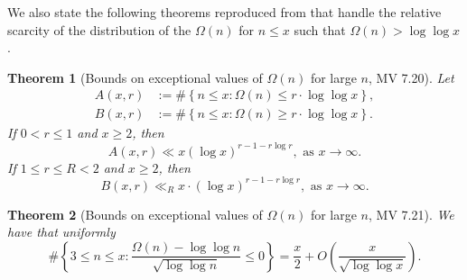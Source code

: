\documentclass[11pt,reqno,a4letter]{article}
\numberwithin{figure}{section}
\numberwithin{table}{section}
\theoremstyle{plain}
\newtheorem{theorem}{Theorem}
\numberwithin{theorem}{section}
\theoremstyle{definition}
\begin{document}
We also state the following theorems reproduced from \cite[\S 7.4]{MV} that handle the relative 
scarcity of the distribution of the $\Omega(n)$ for $n \leq x$ such that 
$\Omega(n) > \log\log x$. 

\begin{theorem}[Bounds on exceptional values of $\Omega(n)$ for large $n$, MV 7.20] 
\label{theorem_MV_Thm7.20-init_stmt} 
Let 
\begin{align*} 
A(x, r) & := \#\left\{n \leq x: \Omega(n) \leq r \cdot \log\log x\right\}, \\ 
B(x, r) & := \#\left\{n \leq x: \Omega(n) \geq r \cdot \log\log x\right\}. 
\end{align*} 
If $0 < r \leq 1$ and $x \geq 2$, then 
\[
A(x, r) \ll x (\log x)^{r-1 - r\log r}, \text{ \ as\ } x \rightarrow \infty. 
\]
If $1 \leq r \leq R < 2$ and $x \geq 2$, then 
\[
B(x, r) \ll_R x \cdot (\log x)^{r-1-r \log r}, \text{ \ as\ } x \rightarrow \infty. 
\]
\end{theorem} 

\begin{theorem}[Bounds on exceptional values of $\Omega(n)$ for large $n$, MV 7.21] 
\label{theorem_MV_Thm7.21-init_stmt} 
We have that uniformly 
\[
\#\left\{3 \leq n \leq x: \frac{\Omega(n) - \log\log n}{\sqrt{\log\log n}} \leq 0\right\} = 
     \frac{x}{2} + O\left(\frac{x}{\sqrt{\log\log x}}\right). 
\]
\end{theorem} 
\end{document}
